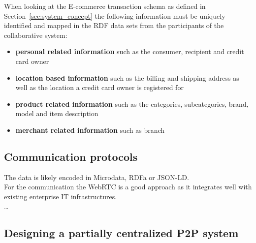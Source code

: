 

When looking at the \gls{E-commerce} transaction schema as defined in Section~\ref{sec:system_concept} the following information must be uniquely identified and mapped in the \gls{RDF} data sets from the participants of the collaborative system: \@

\begin{itemize}
	\item \textbf{personal related information} such as the consumer, recipient and credit card owner
	\item \textbf{location based information} such as the billing and shipping address as well as the location a credit card owner is registered for
	\item \textbf{product related information} such as the categories, subcategories, brand, model and item description
	\item \textbf{merchant related information} such as branch
\end{itemize}


\subsection{Communication protocols}
\label{subsec:comm_protocol}

 The data is likely encoded in Microdata, \gls{RDFa} or \gls{JSON-LD}. \\

For the communication the \gls{WebRTC} is a good approach as it integrates well with existing enterprise IT infrastructures.
\\

\ldots


\subsection{Designing a partially centralized \gls{P2P} system}
\label{subsec:p2p_partially_centralized_system}

